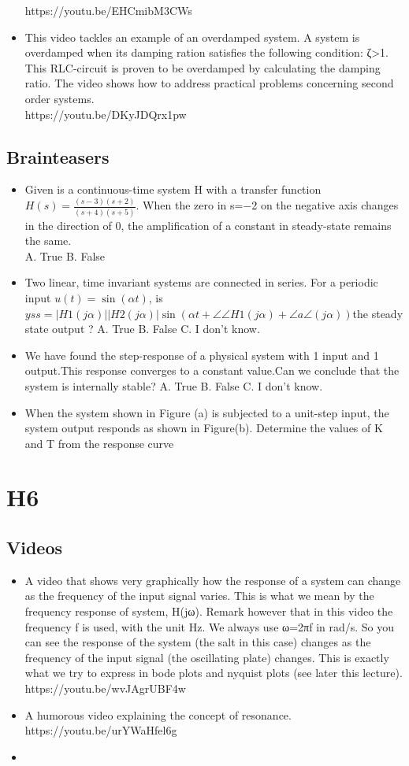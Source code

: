 \documentclass{document}
\begin{document}
\begin{itemize}
			https://youtu.be/EHCmibM3CWs
			\item This video tackles an example of an overdamped system. A system is overdamped when its damping ration satisfies the following condition: ζ>1. This RLC-circuit is proven to be overdamped by calculating the damping ratio. The video shows how to address practical problems concerning second order systems.\\
			https://youtu.be/DKyJDQrx1pw
		\end{itemize}
	\subsection{Brainteasers}
	\begin{itemize}
		\item 	Given is a continuous-time system H with a transfer function $H(s)=\frac{(s−3)(s+2)}{(s+4)(s+5)}$. When the zero in s=−2 on the negative axis changes in the direction of 0, the amplification of a constant in steady-state remains the same.\\
		A. True
		B. False
		\item Two linear, time invariant systems are connected in series. For a periodic input $ u(t)=\sin(\alpha t)$, is $yss=|H1(jα)||H2(jα)|\sin(αt+∠\angle H1(jα)+∠a\angle (jα))  $the steady state output ? 
		A. True
		B. False
		C. I don't know.
		\item We have found the step-response of a physical system with 1 input and 1 output.This response converges to a constant value.Can we conclude that the system is internally stable? 
		A. True
		B. False
		C. I don't know.
		\item When the system shown in Figure (a) is subjected to a unit-step input, the system output responds as shown in Figure(b). Determine the values of K and T from the response curve
	\end{itemize}
	\section{H6}
		\subsection{Videos}
		\begin{itemize}
			\item A video that shows very graphically how the response of a system can change as the frequency of the input signal varies.
			This is what we mean by the frequency response of system, H(jω). Remark however that in this video the frequency f is used, with the unit Hz. We always use ω=2πf in rad/s.
			So you can see the response of the system (the salt in this case) changes as the frequency of the input signal (the oscillating plate) changes. This is exactly what we try to express in bode plots and nyquist plots (see later this lecture).\\
			https://youtu.be/wvJAgrUBF4w
			\item A humorous video explaining the concept of resonance. \\
			https://youtu.be/urYWaHfel6g
			\item 
		\end{itemize}
\end{document}
